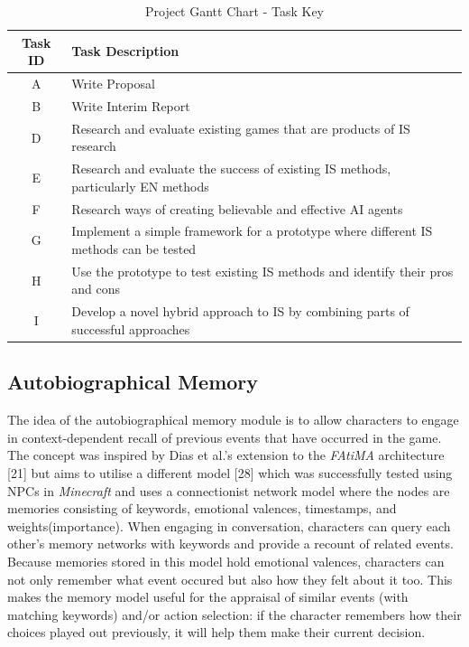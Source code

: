 \documentclass{sig-alternate-05-2015}
\begin{document}
\begin{table}[!b]
\centering
\caption{Project Gantt Chart - Task Key}
    \begin{tabular}{| c | p{13cm} |}
    \hline
    \textbf{Task ID} & \textbf{Task Description} \\ \hline
    \cellcolor{green!50}A & Write Proposal \\ \hline
    \cellcolor{green!50}B & Write Interim Report \\ \hline
    \cellcolor{green!50}D & Research and evaluate existing games that are products of IS research \\ \hline
    \cellcolor{green!50}E & Research and evaluate the success of existing IS methods, particularly EN methods \\ \hline
    \cellcolor{green!50}F & Research ways of creating believable and effective AI agents \\ \hline
    \cellcolor{orange!50}G & Implement a simple framework for a prototype where different IS methods can be tested \\ \hline
    \cellcolor{red!50}H & Use the prototype to test existing IS methods and identify their pros and cons \\ \hline
    \cellcolor{orange!50}I & Develop a novel hybrid approach to IS by combining parts of successful approaches \\ \hline
    \end{tabular}
\end{table}

\subsection{Autobiographical Memory}
\noindent The idea of the autobiographical memory module is to allow characters to engage in context-dependent recall of previous events that have occurred in the game. The concept was inspired by Dias et al.'s extension to the \textit{FAtiMA} architecture [21] but aims to utilise a different model [28] which was successfully tested using NPCs in \textit{Minecraft} and uses a  connectionist network model where the nodes are memories consisting of keywords, emotional valences, timestamps, and weights(importance). When engaging in conversation, characters can query each other's memory networks with keywords and provide a recount of related events.\\

Because memories stored in this model hold emotional valences, characters can not only remember what event occured but also how they felt about it too. This makes the memory model useful for the appraisal of similar events (with matching keywords) and/or action selection: if the character remembers how their choices played out previously, it will help them make their current decision.
\end{document}
